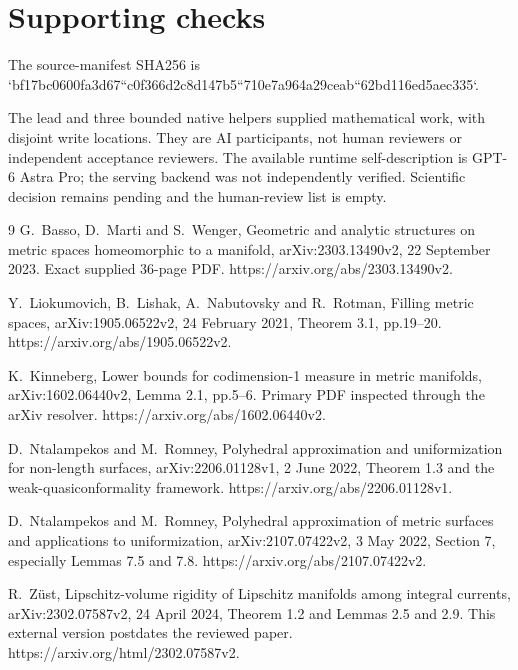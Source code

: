 \documentclass[10pt]{article}
\begin{document}
\section*{Supporting checks}
The source-manifest SHA256 is `bf17bc0600fa3d67``c0f366d2c8d147b5``710e7a964a29ceab``62bd116ed5aec335`.\par
The lead and three bounded native helpers supplied mathematical work, with disjoint write locations. They are AI participants, not human reviewers or independent acceptance reviewers. The available runtime self-description is GPT-6 Astra Pro; the serving backend was not independently verified. Scientific decision remains pending and the human-review list is empty.\par
9 G. Basso, D. Marti and S. Wenger, Geometric and analytic structures on metric spaces homeomorphic to a manifold, arXiv:2303.13490v2, 22 September 2023. Exact supplied 36-page PDF. https://arxiv.org/abs/2303.13490v2.\par
Y. Liokumovich, B. Lishak, A. Nabutovsky and R. Rotman, Filling metric spaces, arXiv:1905.06522v2, 24 February 2021, Theorem 3.1, pp.19–20. https://arxiv.org/abs/1905.06522v2.\par
K. Kinneberg, Lower bounds for codimension-1 measure in metric manifolds, arXiv:1602.06440v2, Lemma 2.1, pp.5–6. Primary PDF inspected through the arXiv resolver. https://arxiv.org/abs/1602.06440v2.\par
D. Ntalampekos and M. Romney, Polyhedral approximation and uniformization for non-length surfaces, arXiv:2206.01128v1, 2 June 2022, Theorem 1.3 and the weak-quasiconformality framework. https://arxiv.org/abs/2206.01128v1.\par
D. Ntalampekos and M. Romney, Polyhedral approximation of metric surfaces and applications to uniformization, arXiv:2107.07422v2, 3 May 2022, Section 7, especially Lemmas 7.5 and 7.8. https://arxiv.org/abs/2107.07422v2.\par
R. Züst, Lipschitz-volume rigidity of Lipschitz manifolds among integral currents, arXiv:2302.07587v2, 24 April 2024, Theorem 1.2 and Lemmas 2.5 and 2.9. This external version postdates the reviewed paper. https://arxiv.org/html/2302.07587v2.\par
\end{document}
